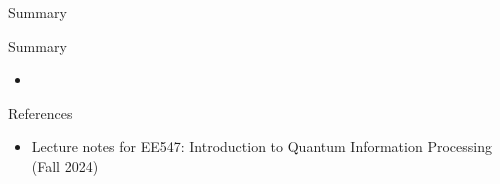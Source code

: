 \documentclass[9pt]{beamer}
\begin{document}
    \begin{frame}{Summary}
        \begin{block}{Summary}
            \begin{itemize}
                \item 
            \end{itemize}
        \end{block}
    \end{frame}


    \begin{frame}{References}
        \begin{itemize}
            \item Lecture notes for EE547: Introduction to Quantum Information Processing (Fall 2024)
        \end{itemize}
        \vspace{6cm}
    \end{frame}
\end{document}
